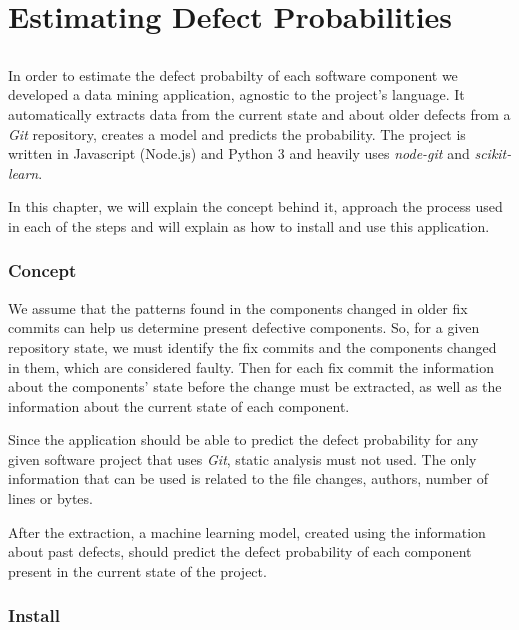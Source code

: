 \chapter{Estimating Defect Probabilities} \label{chap:chap3}

\section*{}

In order to estimate the defect probabilty of each software component we developed a data mining application, agnostic to the project's language. 
It automatically extracts data from the current state and about older defects from a \emph{Git} repository, creates a model and predicts the probability. The project is written in Javascript (Node.js) and Python 3 and heavily uses \emph{node-git}
and \emph{scikit-learn}.

In this chapter, we will explain the concept behind it, approach the process used in each of the steps and will explain as how to install and use this application.

\subsection{Concept}

We assume that the patterns found in the components changed in older fix commits can help us determine present defective components. 
So, for a given repository state, we must identify the fix commits and the components changed in them, which are considered faulty.
Then for each fix commit the information about the components' state before the change must be extracted, as well as the information about the current state of each component.

Since the application should be able to predict the defect probability for any given software project that uses \emph{Git}, static analysis must not used. 
The only information that can be used is related to the file changes, authors, number of lines or bytes.

After the extraction, a machine learning model, created using the information about past defects, should predict the defect probability of each component present in the current state of the project.


\subsection{Install}

